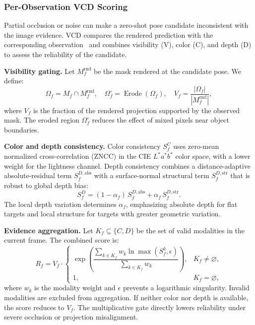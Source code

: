 \documentclass[review]{vgtc}
\begin{document}
\subsubsection{Per-Observation VCD Scoring}

Partial occlusion or noise can make a zero-shot pose candidate inconsistent with the image evidence. VCD compares the rendered prediction with the corresponding observation~\cite{deepim2018,latentfusion2020,focalpose2022} and combines visibility (V), color (C), and depth (D) to assess the reliability of the candidate.

\textbf{Visibility gating.}
Let $M_f^{\mathrm{rnd}}$ be the mask rendered at the candidate pose. We define:
\begin{equation}
\Omega_f = M_f \cap M_f^{\mathrm{rnd}}, \quad \Omega_f^{\circ} = \operatorname{Erode}(\Omega_f), \quad V_f = \frac{|\Omega_f|}{|M_f^{\mathrm{rnd}}|},
\label{eq:visibility}
\end{equation}
where $V_f$ is the fraction of the rendered projection supported by the observed mask. The eroded region $\Omega_f^\circ$ reduces the effect of mixed pixels near object boundaries.

\textbf{Color and depth consistency.}
Color consistency $S_f^C$ uses zero-mean normalized cross-correlation (ZNCC) in the CIE $L^*a^*b^*$ color space, with a lower weight for the lightness channel. Depth consistency combines a distance-adaptive absolute-residual term $S_f^{D,\mathrm{abs}}$ with a surface-normal structural term $S_f^{D,\mathrm{str}}$ that is robust to global depth bias:
\begin{equation}
S_f^D = (1-\alpha_f)\,S_f^{D,\mathrm{abs}} + \alpha_f\,S_f^{D,\mathrm{str}}.
\label{eq:depth-score}
\end{equation}
The local depth variation determines $\alpha_f$, emphasizing absolute depth for flat targets and local structure for targets with greater geometric variation.

\textbf{Evidence aggregation.}
Let $K_f\subseteq\{C,D\}$ be the set of valid modalities in the current frame. The combined score is:
\begin{equation}
R_f = V_f \cdot
\begin{cases}
\exp\!\left(\dfrac{\sum_{k \in K_f} w_k \ln \max(S_f^{k}, \epsilon)}{\sum_{k \in K_f} w_k}\right), & K_f \neq \varnothing, \\[6pt]
1, & K_f = \varnothing,
\end{cases}
\label{eq:vcd}
\end{equation}
where $w_k$ is the modality weight and $\epsilon$ prevents a logarithmic singularity. Invalid modalities are excluded from aggregation. If neither color nor depth is available, the score reduces to $V_f$. The multiplicative gate directly lowers reliability under severe occlusion or projection misalignment.
\end{document}
